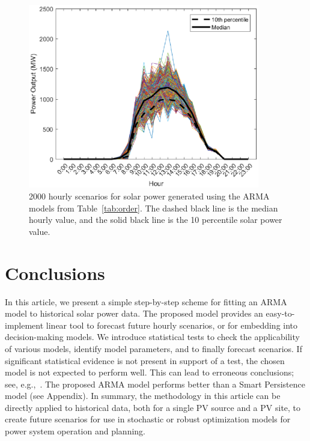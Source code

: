 \documentclass[review]{elsarticle}
\begin{document}
\begin{figure}[!t]
\centering
\includegraphics[width=0.9\textwidth]{sample_smooth.eps}
\caption{2000 hourly scenarios for solar power generated using the ARMA models 
from Table~\ref{tab:order}. The dashed black line is the median hourly value, 
and the solid black line is
the 10 percentile solar power value.}
 \label{fig:sample}
\end{figure}

\section{Conclusions}
In this article, we present a simple step-by-step scheme for fitting an ARMA 
model to 
historical solar power data. The proposed model provides an easy-to-implement 
linear tool to forecast future hourly scenarios, or for embedding into 
decision-making models. 
We introduce statistical tests to check the applicability of various models, 
identify model parameters, and to finally forecast scenarios. If significant  statistical evidence is not present in support of a  test, the chosen model is not expected to perform well. This can lead to 
erroneous conclusions; see, 
e.g.,~\cite{kwiatkowski1992testing,phillips1988testing}. 
The proposed ARMA model performs better than a Smart 
Persistence model (see Appendix). 
In summary, the methodology in this article can be directly applied to historical data,  both for a single PV source and a PV site,
to create future scenarios for use in stochastic or robust optimization models 
for power system operation and planning. 
\end{document}
